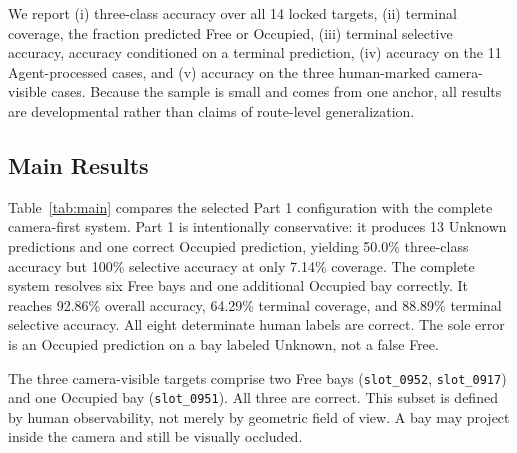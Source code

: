 \documentclass[conference]{IEEEtran}
\begin{document}
We report (i) three-class accuracy over all 14 locked targets, (ii) terminal coverage, the fraction predicted Free or Occupied, (iii) terminal selective accuracy, accuracy conditioned on a terminal prediction, (iv) accuracy on the 11 Agent-processed cases, and (v) accuracy on the three human-marked camera-visible cases. Because the sample is small and comes from one anchor, all results are developmental rather than claims of route-level generalization.

\subsection{Main Results}
Table~\ref{tab:main} compares the selected Part 1 configuration with the complete camera-first system. Part 1 is intentionally conservative: it produces 13 Unknown predictions and one correct Occupied prediction, yielding 50.0\% three-class accuracy but 100\% selective accuracy at only 7.14\% coverage. The complete system resolves six Free bays and one additional Occupied bay correctly. It reaches 92.86\% overall accuracy, 64.29\% terminal coverage, and 88.89\% terminal selective accuracy. All eight determinate human labels are correct. The sole error is an Occupied prediction on a bay labeled Unknown, not a false Free.

The three camera-visible targets comprise two Free bays (\texttt{slot\_0952}, \texttt{slot\_0917}) and one Occupied bay (\texttt{slot\_0951}). All three are correct. This subset is defined by human observability, not merely by geometric field of view. A bay may project inside the camera and still be visually occluded.

\begin{table}[t]
\centering
\caption{Locked-GT results at frame 6241. Best values are bold. False-U is the percentage of human-Unknown bays incorrectly resolved to a terminal state.}
\label{tab:main}
\footnotesize
{}
\end{table}
\end{document}
